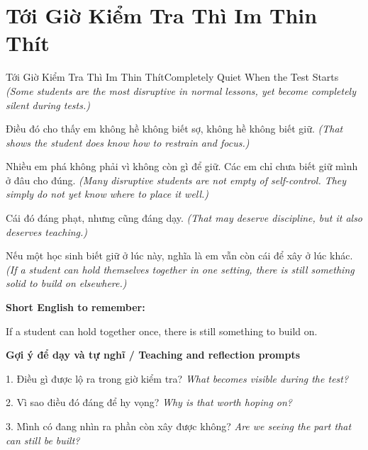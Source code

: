 \section{Tới Giờ Kiểm Tra Thì Im Thin Thít}
\begin{truyen}{Tới Giờ Kiểm Tra Thì Im Thin Thít}{Completely Quiet When the Test Starts}
\textit{(Some students are the most disruptive in normal lessons, yet become completely silent during tests.)}

Điều đó cho thấy em không hề không biết sợ, không hề không biết giữ.
\textit{(That shows the student does know how to restrain and focus.)}

Nhiều em phá không phải vì không còn gì để giữ. Các em chỉ chưa biết giữ mình ở đâu cho đúng.
\textit{(Many disruptive students are not empty of self-control. They simply do not yet know where to place it well.)}

Cái đó đáng phạt, nhưng cũng đáng dạy.
\textit{(That may deserve discipline, but it also deserves teaching.)}

\end{truyen}

\begin{baihoc}
Nếu một học sinh biết giữ ở lúc này, nghĩa là em vẫn còn cái để xây ở lúc khác.
\textit{(If a student can hold themselves together in one setting, there is still something solid to build on elsewhere.)}
\end{baihoc}

\begin{ghinhoanh}
\textbf{Short English to remember:}

If a student can hold together once, there is still something to build on.

\end{ghinhoanh}

\begin{tuhocnhanh}
\textbf{Gợi ý để dạy và tự nghĩ / Teaching and reflection prompts}

1. Điều gì được lộ ra trong giờ kiểm tra? \textit{What becomes visible during the test?}

2. Vì sao điều đó đáng để hy vọng? \textit{Why is that worth hoping on?}

3. Mình có đang nhìn ra phần còn xây được không? \textit{Are we seeing the part that can still be built?}
\end{tuhocnhanh}
\ngancach

